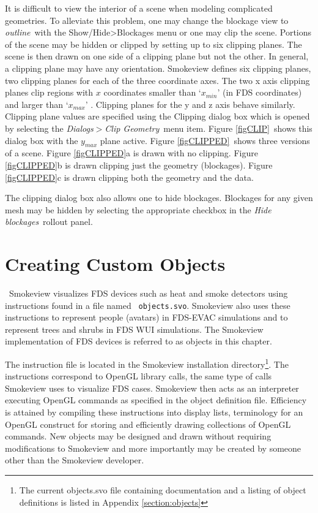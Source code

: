 \documentclass[11pt,twoside]{book}
\begin{document}
It is difficult to view the interior of a scene when modeling
complicated geometries.  To alleviate this problem, one may change the blockage view
to {\em outline}\ with the Show/Hide>Blockages menu or one may clip the scene.
Portions of
the scene may be hidden or clipped by setting up to six clipping
planes. The scene is then drawn on one side of a clipping plane but
not the other. In general, a clipping plane may have any
orientation. Smokeview defines six clipping planes, two clipping planes for each of the
three coordinate axes.   The two x axis clipping planes clip
regions with $x$ coordinates smaller than `$x_{min}$' (in FDS coordinates) and larger than `$x_{max}$' .
Clipping planes for the y and z axis behave similarly.
Clipping plane values are
specified using the Clipping dialog box which is opened by
selecting the {\em Dialogs$>$Clip Geometry}\ menu item. Figure
\ref{figCLIP}\ shows this dialog box with the $y_{max}$ plane
active. Figure \ref{figCLIPPED}\ shows three versions of a scene.
Figure \ref{figCLIPPED}a is drawn with no clipping. Figure
\ref{figCLIPPED}b is drawn clipping just the geometry (blockages).
Figure \ref{figCLIPPED}c is drawn clipping both the geometry and
the data.

The clipping dialog box also allows one to hide blockages.  Blockages for any given mesh may be hidden
by selecting the appropriate checkbox in the {\em Hide blockages}\ rollout panel.



\chapter{Creating Custom Objects}
\label{chap:devices}\ Smokeview visualizes FDS devices such as heat
and smoke detectors using instructions found in a file named {\tt
objects.svo}. Smokeview also uses these instructions to represent
people (avatars) in FDS-EVAC simulations and to represent trees
and shrubs in FDS WUI simulations. The Smokeview implementation of
FDS devices is referred to as objects in this chapter.

The instruction file is located in the  Smokeview installation
directory\footnote{The current objects.svo file containing
documentation and a listing of object definitions is listed in
Appendix \ref{section:objects}}. The instructions correspond to
OpenGL library calls, the same type of calls Smokeview uses to
visualize FDS cases. Smokeview then acts as an interpreter
executing OpenGL commands as specified in the object definition
file. Efficiency is attained by compiling these instructions into
display lists, terminology for an OpenGL construct for storing and
efficiently drawing collections of OpenGL commands.  New objects
may be designed and drawn without requiring modifications to
Smokeview and more importantly may be created by someone other
than the Smokeview developer.
\end{document}
